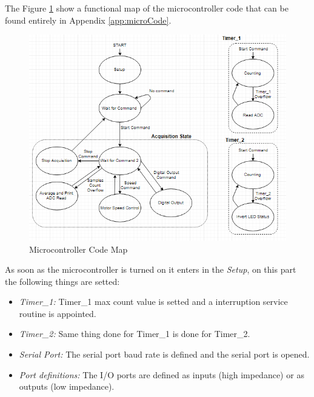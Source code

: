 	The Figure \ref{fig:microCode} show a functional map of the microcontroller code that can be found entirely in Appendix \ref{app:microCode}.
	
	\begin{figure}[htbp]
		\centering
		\includegraphics[scale=1]{figuras/fig-microCodeMap}
		\caption{Microcontroller Code Map \cite{microCodeMap}}
		\label{fig:microCode}
	\end{figure}
	
	
	As soon as the microcontroller is turned on it enters in the \textit{Setup}, on this part the following things are setted:
	\begin{itemize}
		\item \textit{Timer\_1: } Timer\_1 max count value is setted and a interruption service routine is appointed.\label{itm:mcu-prog-timer1}
		\item \textit{Timer\_2: } Same thing done for Timer\_1 is done for Timer\_2.\label{itm:mcu-prog-timer2}
		\item \textit{Serial Port: } The serial port baud rate is defined and the serial port is opened.\label{itm:mcu-prog-serial-port}
		\item \textit{Port definitions: } The I/O ports are defined as inputs (high impedance) or as outputs (low impedance).\label{itm:mcu-prog-port}
	\end{itemize}
	
